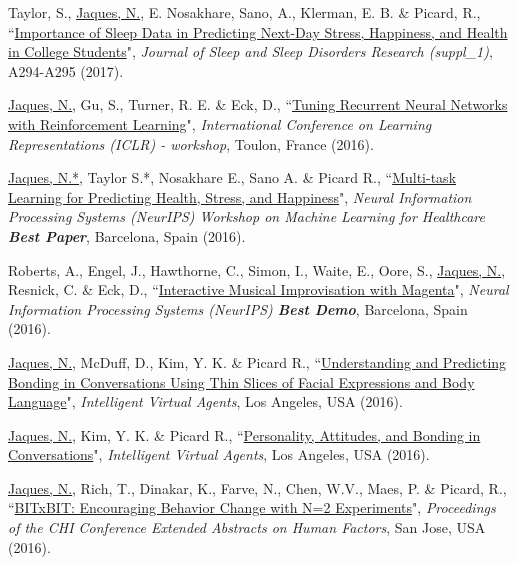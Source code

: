 \documentclass[paper=letter,fontsize=11pt]{scrartcl} %
\newcommand{\PaperEntry}[6]{
		\noindent #1, ``\href{#6}{#2}", \textit{#3}, #4 (#5).}
\begin{document}
\begin{etaremune}
\item \PaperEntry{Taylor, S., \underline{Jaques, N.}, E. Nosakhare, Sano, A., Klerman, E. B. \& Picard, R.}{Importance of Sleep Data in Predicting Next-Day Stress, Happiness, and Health in College Students}{Journal of Sleep and Sleep Disorders Research (suppl\_1)}{A294-A295}{2017}{https://affect.media.mit.edu/pdfs/17.Taylor-etal-MoodPrediction-SLEEP2017-Poster.pdf}

\item \PaperEntry{\underline{Jaques, N.}, Gu, S., Turner, R. E. \& Eck, D.}{Tuning Recurrent Neural Networks with Reinforcement Learning}{International Conference on Learning Representations (ICLR) - workshop}{Toulon, France}{2016}{https://openreview.net/pdf?id=Syyv2e-Kx}

\item \PaperEntry{\underline{Jaques, N.*}, Taylor S.*, Nosakhare E., Sano A. \& Picard R.}{Multi-task Learning for Predicting Health, Stress, and Happiness}{Neural Information Processing Systems (NeurIPS) Workshop on Machine Learning for Healthcare \textbf{Best Paper}}{Barcelona, Spain}{2016}{https://pdfs.semanticscholar.org/b228/7a406985980515d5cc63e9b37fb17c5186f8.pdf}

\item \PaperEntry{Roberts, A., Engel, J., Hawthorne, C., Simon, I., Waite, E., Oore, S., \underline{Jaques, N.}, Resnick, C. \& Eck, D.}{Interactive Musical Improvisation with Magenta}{Neural Information Processing Systems (NeurIPS) \textbf{Best Demo}}{Barcelona, Spain}{2016}{https://nips.cc/Conferences/2016/Schedule?showEvent=6307}

\item \PaperEntry{\underline{Jaques, N.}, McDuff, D., Kim, Y. K. \& Picard R.}{Understanding and Predicting Bonding in Conversations Using Thin Slices of Facial Expressions and Body Language}{Intelligent Virtual Agents}{Los Angeles, USA}{2016}{http://affect.media.mit.edu/pdfs/16.Jaques-IVAbonding.pdf}

\item \PaperEntry{\underline{Jaques, N.}, Kim, Y. K. \& Picard R.}{Personality, Attitudes, and Bonding in Conversations}{Intelligent Virtual Agents}{Los Angeles, USA}{2016}{http://affect.media.mit.edu/pdfs/16.Jaques-IVApersonality.pdf}

\item \PaperEntry{\underline{Jaques, N.}, Rich, T., Dinakar, K., Farve, N., Chen, W.V., Maes, P. \& Picard, R.}{BITxBIT: Encouraging Behavior Change with N=2 Experiments}{Proceedings of the CHI Conference Extended Abstracts on Human Factors}{San Jose, USA}{2016}{http://affect.media.mit.edu/pdfs/16.Jaques-etal-CHI.pdf}


\end{etaremune}
\end{document}
